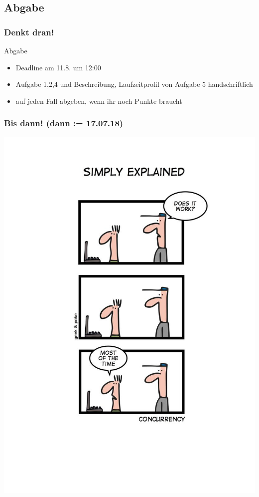 \documentclass[18pt]{beamer}
\begin{document}
	\subsection{Abgabe}
	\begin{frame}
		\frametitle{Denkt dran!}
		\begin{alertblock}{Abgabe}
			\begin{itemize}
				\item Deadline am 11.8. um 12:00
				\item Aufgabe 1,2,4 und Beschreibung, Laufzeitprofil von Aufgabe 5 handschriftlich
				\item auf jeden Fall abgeben, wenn ihr noch Punkte braucht
			\end{itemize}
		\end{alertblock}
	\end{frame}

	\begin{frame}
		\frametitle{Bis dann! (dann  := 17.07.18)}
		\centering
		\includegraphics[scale=1.0]{./comics/geek_and_poke_concurrency.jpg}
	\end{frame}
\end{document}
